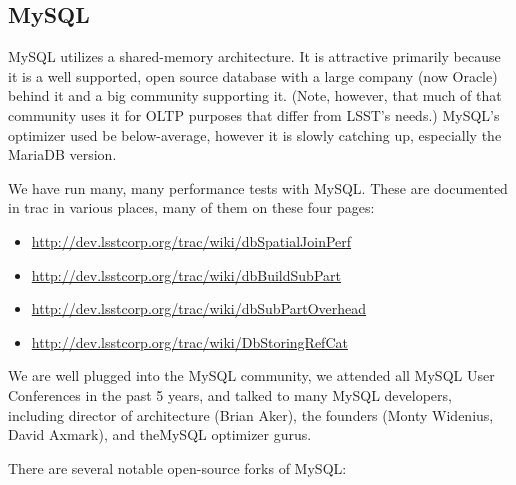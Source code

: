 \documentclass[DM,lsstdraft,toc]{lsstdoc}
\begin{document}
\subsection{MySQL}\label{mysql-1}

MySQL utilizes a shared-memory architecture. It is attractive primarily
because it is a well supported, open source database with a large
company (now Oracle) behind it and a big community supporting it. (Note,
however, that much of that community uses it for OLTP purposes that
differ from LSST's needs.) MySQL's optimizer used be below-average,
however it is slowly catching up, especially the MariaDB version.

We have run many, many performance tests with MySQL. These are
documented in trac in various places, many of them on these four pages:

\begin{itemize}
\item
  \url{http://dev.lsstcorp.org/trac/wiki/dbSpatialJoinPerf}
\item
  \url{http://dev.lsstcorp.org/trac/wiki/dbBuildSubPart}
\item
  \url{http://dev.lsstcorp.org/trac/wiki/dbSubPartOverhead}
\item
  \url{http://dev.lsstcorp.org/trac/wiki/DbStoringRefCat}
\end{itemize}

We are well plugged into the MySQL community, we attended all MySQL User
Conferences in the past 5 years, and talked to many MySQL developers,
including director of architecture (Brian Aker), the founders (Monty
Widenius, David Axmark), and theMySQL optimizer gurus.

There are several notable open-source forks of MySQL:
\end{document}
